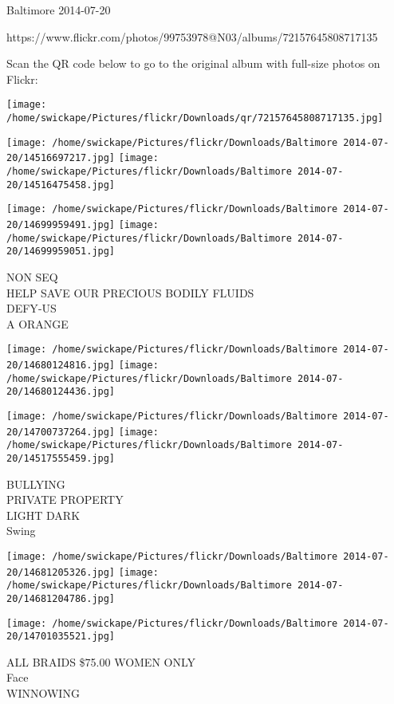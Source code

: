 \documentclass[10pt,letterpaper]{article}
\begin{document}
Baltimore 2014-07-20

https://www.flickr.com/photos/99753978@N03/albums/72157645808717135

Scan the QR code below to go to the original album with full-size photos on Flickr:

\texttt{[image: /home/swickape/Pictures/flickr/Downloads/qr/72157645808717135.jpg]}
\pagebreak

\texttt{[image: /home/swickape/Pictures/flickr/Downloads/Baltimore 2014-07-20/14516697217.jpg]}
\texttt{[image: /home/swickape/Pictures/flickr/Downloads/Baltimore 2014-07-20/14516475458.jpg]}

\texttt{[image: /home/swickape/Pictures/flickr/Downloads/Baltimore 2014-07-20/14699959491.jpg]}
\texttt{[image: /home/swickape/Pictures/flickr/Downloads/Baltimore 2014-07-20/14699959051.jpg]}

NON SEQ\\
HELP SAVE OUR PRECIOUS BODILY FLUIDS\\
DEFY{-}US\\
A ORANGE\\
\pagebreak

\texttt{[image: /home/swickape/Pictures/flickr/Downloads/Baltimore 2014-07-20/14680124816.jpg]}
\texttt{[image: /home/swickape/Pictures/flickr/Downloads/Baltimore 2014-07-20/14680124436.jpg]}

\texttt{[image: /home/swickape/Pictures/flickr/Downloads/Baltimore 2014-07-20/14700737264.jpg]}
\texttt{[image: /home/swickape/Pictures/flickr/Downloads/Baltimore 2014-07-20/14517555459.jpg]}

BULLYING\\
PRIVATE PROPERTY\\
LIGHT DARK\\
Swing\\
\pagebreak

\texttt{[image: /home/swickape/Pictures/flickr/Downloads/Baltimore 2014-07-20/14681205326.jpg]}
\texttt{[image: /home/swickape/Pictures/flickr/Downloads/Baltimore 2014-07-20/14681204786.jpg]}

\texttt{[image: /home/swickape/Pictures/flickr/Downloads/Baltimore 2014-07-20/14701035521.jpg]}

ALL BRAIDS \$75.00 WOMEN ONLY\\
Face\\
WINNOWING\\
\pagebreak
\end{document}
